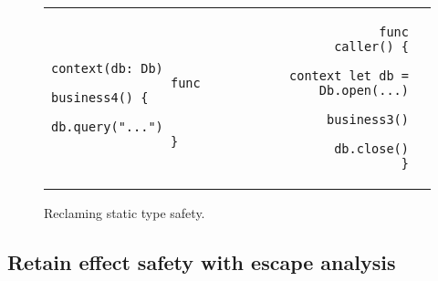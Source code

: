 \documentclass[acmsmall]{acmart}
\begin{document}
\begin{figure}
    \begin{tabular}{p{} rl}
        \begin{minipage}[t]{0.3\textwidth}
            \begin{verbatim}
                context(db: Db)
                func business4() {
                    db.query("...")
                }
            \end{verbatim}
        \end{minipage}
        &
        \begin{minipage}[t]{0.3\textwidth}
            \begin{verbatim}
                func caller() {
                    context let db = Db.open(...)
                    business3()
                    db.close()
                }
            \end{verbatim}
        \end{minipage}
    \end{tabular}
    \caption{Reclaming static type safety.}
    \label{fig:implicits}
\end{figure}

\subsection{Retain effect safety with escape analysis} \label{subsec:escape}

%







\end{document}
